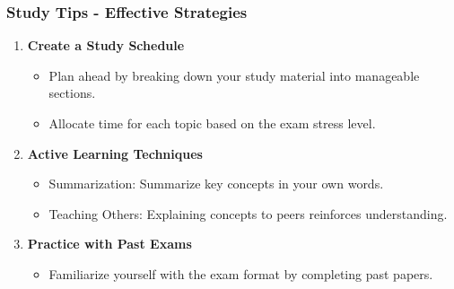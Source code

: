 \documentclass[aspectratio=169]{beamer}
\begin{document}
\begin{frame}[fragile]
    \frametitle{Study Tips - Effective Strategies}
    \begin{enumerate}
        \item \textbf{Create a Study Schedule}
            \begin{itemize}
                \item Plan ahead by breaking down your study material into manageable sections.
                \item Allocate time for each topic based on the exam stress level.
            \end{itemize}
        \item \textbf{Active Learning Techniques}
            \begin{itemize}
                \item Summarization: Summarize key concepts in your own words.
                \item Teaching Others: Explaining concepts to peers reinforces understanding.
            \end{itemize}
        \item \textbf{Practice with Past Exams}
            \begin{itemize}
                \item Familiarize yourself with the exam format by completing past papers.
            \end{itemize}
    \end{enumerate}
\end{frame}
\end{document}
